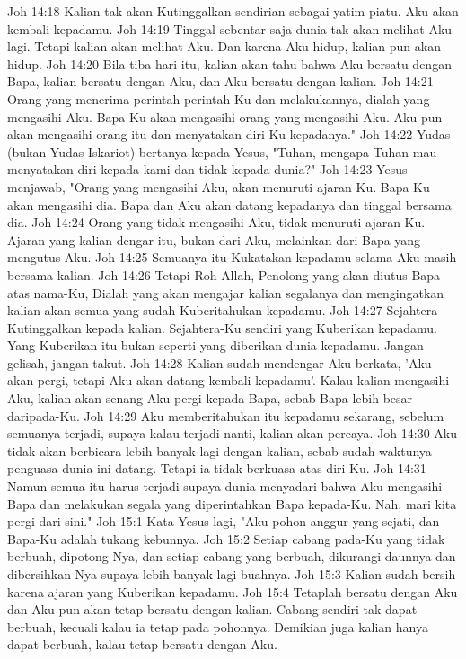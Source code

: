 Joh 14:18  Kalian tak akan Kutinggalkan sendirian sebagai yatim piatu. Aku akan kembali kepadamu.
Joh 14:19  Tinggal sebentar saja dunia tak akan melihat Aku lagi. Tetapi kalian akan melihat Aku. Dan karena Aku hidup, kalian pun akan hidup.
Joh 14:20  Bila tiba hari itu, kalian akan tahu bahwa Aku bersatu dengan Bapa, kalian bersatu dengan Aku, dan Aku bersatu dengan kalian.
Joh 14:21  Orang yang menerima perintah-perintah-Ku dan melakukannya, dialah yang mengasihi Aku. Bapa-Ku akan mengasihi orang yang mengasihi Aku. Aku pun akan mengasihi orang itu dan menyatakan diri-Ku kepadanya."
Joh 14:22  Yudas (bukan Yudas Iskariot) bertanya kepada Yesus, "Tuhan, mengapa Tuhan mau menyatakan diri kepada kami dan tidak kepada dunia?"
Joh 14:23  Yesus menjawab, "Orang yang mengasihi Aku, akan menuruti ajaran-Ku. Bapa-Ku akan mengasihi dia. Bapa dan Aku akan datang kepadanya dan tinggal bersama dia.
Joh 14:24  Orang yang tidak mengasihi Aku, tidak menuruti ajaran-Ku. Ajaran yang kalian dengar itu, bukan dari Aku, melainkan dari Bapa yang mengutus Aku.
Joh 14:25  Semuanya itu Kukatakan kepadamu selama Aku masih bersama kalian.
Joh 14:26  Tetapi Roh Allah, Penolong yang akan diutus Bapa atas nama-Ku, Dialah yang akan mengajar kalian segalanya dan mengingatkan kalian akan semua yang sudah Kuberitahukan kepadamu.
Joh 14:27  Sejahtera Kutinggalkan kepada kalian. Sejahtera-Ku sendiri yang Kuberikan kepadamu. Yang Kuberikan itu bukan seperti yang diberikan dunia kepadamu. Jangan gelisah, jangan takut.
Joh 14:28  Kalian sudah mendengar Aku berkata, 'Aku akan pergi, tetapi Aku akan datang kembali kepadamu'. Kalau kalian mengasihi Aku, kalian akan senang Aku pergi kepada Bapa, sebab Bapa lebih besar daripada-Ku.
Joh 14:29  Aku memberitahukan itu kepadamu sekarang, sebelum semuanya terjadi, supaya kalau terjadi nanti, kalian akan percaya.
Joh 14:30  Aku tidak akan berbicara lebih banyak lagi dengan kalian, sebab sudah waktunya penguasa dunia ini datang. Tetapi ia tidak berkuasa atas diri-Ku.
Joh 14:31  Namun semua itu harus terjadi supaya dunia menyadari bahwa Aku mengasihi Bapa dan melakukan segala yang diperintahkan Bapa kepada-Ku. Nah, mari kita pergi dari sini."
Joh 15:1  Kata Yesus lagi, "Aku pohon anggur yang sejati, dan Bapa-Ku adalah tukang kebunnya.
Joh 15:2  Setiap cabang pada-Ku yang tidak berbuah, dipotong-Nya, dan setiap cabang yang berbuah, dikurangi daunnya dan dibersihkan-Nya supaya lebih banyak lagi buahnya.
Joh 15:3  Kalian sudah bersih karena ajaran yang Kuberikan kepadamu.
Joh 15:4  Tetaplah bersatu dengan Aku dan Aku pun akan tetap bersatu dengan kalian. Cabang sendiri tak dapat berbuah, kecuali kalau ia tetap pada pohonnya. Demikian juga kalian hanya dapat berbuah, kalau tetap bersatu dengan Aku.
